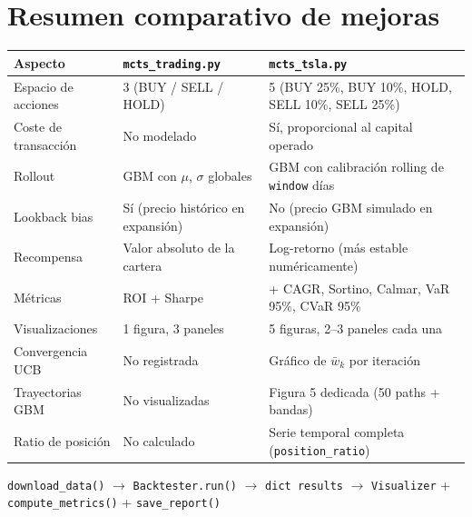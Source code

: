 \documentclass[12pt, a4paper]{article}
\begin{document}
\section{Resumen comparativo de mejoras}

\begin{center}
\renewcommand{\arraystretch}{1.4}
\begin{tabular}{L{3.8cm} L{5cm} L{5cm}}
\toprule
\textbf{Aspecto} & \textbf{\texttt{mcts\_trading.py}} & \textbf{\texttt{mcts\_tsla.py}} \\
\midrule
Espacio de acciones & 3 (BUY / SELL / HOLD) & 5 (BUY 25\%, BUY 10\%, HOLD, SELL 10\%, SELL 25\%) \\
\midrule
Coste de transacción & No modelado & Sí, proporcional al capital operado \\
\midrule
Rollout & GBM con $\mu$, $\sigma$ globales & GBM con calibración rolling de \texttt{window} días \\
\midrule
Lookback bias & Sí (precio histórico en expansión) & No (precio GBM simulado en expansión) \\
\midrule
Recompensa & Valor absoluto de la cartera & Log-retorno (más estable numéricamente) \\
\midrule
Métricas & ROI + Sharpe & + CAGR, Sortino, Calmar, VaR 95\%, CVaR 95\% \\
\midrule
Visualizaciones & 1 figura, 3 paneles & 5 figuras, 2--3 paneles cada una \\
\midrule
Convergencia UCB & No registrada & Gráfico de $\bar{w}_k$ por iteración \\
\midrule
Trayectorias GBM & No visualizadas & Figura 5 dedicada (50 paths + bandas) \\
\midrule
Ratio de posición & No calculado & Serie temporal completa (\texttt{position\_ratio}) \\
\bottomrule
\end{tabular}
\end{center}

\vspace{1em}
\begin{tcolorbox}[mejora, title={Flujo de datos entre secciones}]
\centering\small
\texttt{download\_data()} $\rightarrow$ \texttt{Backtester.run()} $\rightarrow$ \texttt{dict results}
$\rightarrow$ \texttt{Visualizer} + \texttt{compute\_metrics()} + \texttt{save\_report()}
\end{tcolorbox}
\end{document}
